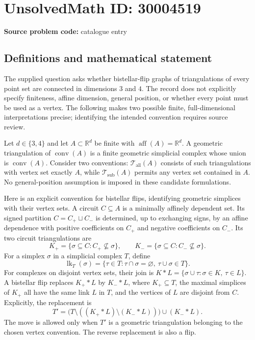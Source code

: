 \documentclass[11pt]{article}
\newcommand{\R}{\mathbb{R}}
\begin{document}
\section*{UnsolvedMath ID: 30004519}
\textbf{Source problem code:} catalogue entry
\subsection{Definitions and mathematical statement}
The supplied question asks whether bistellar-flip graphs of triangulations of every point set are connected in dimensions \(3\) and \(4\). The record does not explicitly specify finiteness, affine dimension, general position, or whether every point must be used as a vertex. The following makes two possible finite, full-dimensional interpretations precise; identifying the intended convention requires source review.

Let \(d\in\{3,4\}\) and let \(A\subset\R^d\) be finite with \(\operatorname{aff}(A)=\R^d\). A geometric triangulation of \(\operatorname{conv}(A)\) is a finite geometric simplicial complex whose union is \(\operatorname{conv}(A)\). Consider two conventions: \(\mathcal T_{\mathrm{all}}(A)\) consists of such triangulations with vertex set exactly \(A\), while \(\mathcal T_{\mathrm{sub}}(A)\) permits any vertex set contained in \(A\). No general-position assumption is imposed in these candidate formulations.

Here is an explicit convention for bistellar flips, identifying geometric simplices with their vertex sets. A circuit \(C\subseteq A\) is a minimally affinely dependent set. Its signed partition \(C=C_+\sqcup C_-\) is determined, up to exchanging signs, by an affine dependence with positive coefficients on \(C_+\) and negative coefficients on \(C_-\). Its two circuit triangulations are
\[
 K_+=\{\sigma\subseteq C:C_+\nsubseteq\sigma\},\qquad
 K_-=\{\sigma\subseteq C:C_-\nsubseteq\sigma\}.
\]
For a simplex \(\sigma\) in a simplicial complex \(T\), define
\[
 \operatorname{lk}_T(\sigma)=\{\tau\in T:\tau\cap\sigma=\varnothing,\ \tau\cup\sigma\in T\}.
\]
For complexes on disjoint vertex sets, their join is \(K*L=\{\sigma\cup\tau:\sigma\in K,\ \tau\in L\}\). A bistellar flip replaces \(K_+*L\) by \(K_-*L\), where \(K_+\subseteq T\), the maximal simplices of \(K_+\) all have the same link \(L\) in \(T\), and the vertices of \(L\) are disjoint from \(C\). Explicitly, the replacement is
\[
 T'=\bigl(T\setminus((K_+*L)\setminus(K_-*L))\bigr)\cup(K_-*L).
\]
The move is allowed only when \(T'\) is a geometric triangulation belonging to the chosen vertex convention. The reverse replacement is also a flip.
\end{document}

